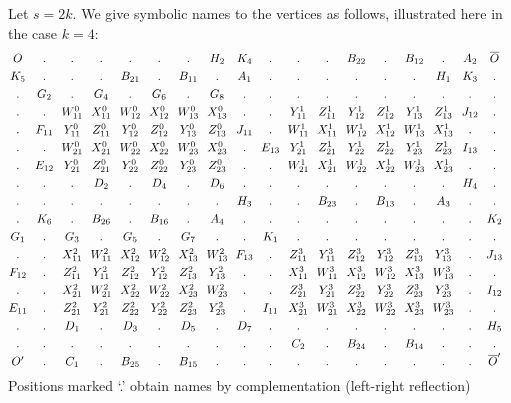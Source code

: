 \goodbreak
\proof
Let $s=2k$. We give symbolic names to the vertices as follows, illustrated here
in the case $k=4$:
$$\vcenter{\halign{%
$\hfil#\hfil$\kern.65em
&$\hfil#\hfil$\kern.65em
&$\hfil#\hfil$\kern.65em
&$\hfil#\hfil$\kern.65em
&$\hfil#\hfil$\kern.65em
&$\hfil#\hfil$\kern.65em
&$\hfil#\hfil$\kern.65em
&$\hfil#\hfil$\kern.65em
&$\hfil#\hfil$\kern.65em
&$\hfil#\hfil$\kern.65em
&$\hfil#\hfil$\kern.65em
&$\hfil#\hfil$\kern.65em
&$\hfil#\hfil$\kern.65em
&$\hfil#\hfil$\kern.65em
&$\hfil#\hfil$\kern.65em
&$\hfil#\hfil$\kern.65em
&$\hfil#\hfil$\kern.65em
&$\hfil#\hfil$\kern.65em
&$\hfil#\hfil$\cr
O&.&.&.&.&.&.&H_2&K_4&.&.&.&B_{22}&.&B_{12}&.&A_2&\Obar\cr
\noalign{\smallskip}
K_5&.&.&.&B_{21}&.&B_{11}&.&A_1&.&.&.&.&.&.&H_1&K_3&.\cr
\noalign{\smallskip}
.&G_2&.&G_4&.&G_6&.&G_8&.&.&.&.&.&.&.&.&.&.\cr
\noalign{\smallskip}
.&.&W_{11}^0&X_{11}^0&W_{12}^0&X_{12}^0&W_{13}^0&X_{13}^0&.&.%
&Y_{11}^1&Z_{11}^1&Y_{12}^1&Z_{12}^1&Y_{13}^1&Z_{13}^1&J_{12}&.\cr
\noalign{\smallskip}
.&F_{11}&Y_{11}^0&Z_{11}^0&Y_{12}^0&Z_{12}^0&Y_{13}^0&Z_{13}^0&J_{11}&.%
&W_{11}^1&X_{11}^1&W_{12}^1&X_{12}^1&W_{13}^1&X_{13}^1&.&.\cr
\noalign{\smallskip}
.&.&W_{21}^0&X_{21}^0&W_{22}^0&X_{22}^0&W_{23}^0&X_{23}^0&.&E_{13}%
&Y_{21}^1&Z_{21}^1&Y_{22}^1&Z_{22}^1&Y_{23}^1&Z_{23}^1&I_{13}&.\cr
\noalign{\smallskip}
.&E_{12}&Y_{21}^0&Z_{21}^0&Y_{22}^0&Z_{22}^0&Y_{23}^0&Z_{23}^0&.&.%
&W_{21}^1&X_{21}^1&W_{22}^1&X_{22}^1&W_{23}^1&X_{23}^1&.&.\cr
\noalign{\smallskip}
.&.&.&D_2&.&D_4&.&D_6&.&.&.&.&.&.&.&.&H_4&.\cr
\noalign{\smallskip}
.&.&.&.&.&.&.&.&H_3&.&.&B_{23}&.&B_{13}&.&A_3&.&.\cr
\noalign{\smallskip}
.&K_6&.&B_{26}&.&B_{16}&.&A_4&.&.&.&.&.&.&.&.&.&K_2\cr
\noalign{\smallskip}
G_1&.&G_3&.&G_5&.&G_7&.&.&K_1&.&.&.&.&.&.&.&.\cr
\noalign{\smallskip}
.&.&X_{11}^2&W_{11}^2&X_{12}^2&W_{12}^2&X_{13}^2&W_{13}^2&F_{13}&.%
&Z_{11}^3&Y_{11}^3&Z_{12}^3&Y_{12}^3&Z_{13}^3&Y_{13}^3&.&J_{13}\cr
\noalign{\smallskip}
F_{12}&.&Z_{11}^2&Y_{11}^2&Z_{12}^2&Y_{12}^2&Z_{13}^2&Y_{13}^2&.&.%
&X_{11}^3&W_{11}^3&X_{12}^3&W_{12}^3&X_{13}^3&W_{13}^3&.&.\cr
\noalign{\smallskip}
.&.&X_{21}^2&W_{21}^2&X_{22}^2&W_{22}^2&X_{23}^2&W_{23}^2&.&.%
&Z_{21}^3&Y_{21}^3&Z_{22}^3&Y_{22}^3&Z_{23}^3&Y_{23}^3&.&I_{12}\cr
\noalign{\smallskip}
E_{11}&.&Z_{21}^2&Y_{21}^2&Z_{22}^2&Y_{22}^2&Z_{23}^2&Y_{23}^2&.&I_{11}%
&X_{21}^3&W_{21}^3&X_{22}^3&W_{22}^3&X_{23}^3&W_{23}^3&.&.\cr
\noalign{\smallskip}
.&.&D_1&.&D_3&.&D_5&.&D_7&.&.&.&.&.&.&.&.&H_5\cr
\noalign{\smallskip}
.&.&.&.&.&.&.&.&.&.&C_2&.&B_{24}&.&B_{14}&.&.&.\cr
\noalign{\smallskip}
O'&.&C_1&.&B_{25}&.&B_{15}&.&.&.&.&.&.&.&.&.&.&\Obar'\cr}}$$
Positions marked `.' obtain names by complementation (left-right reflection)
